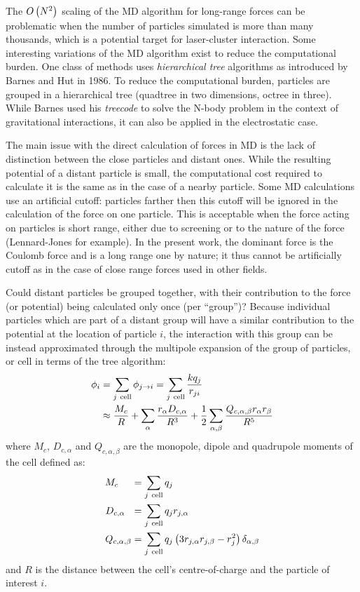 The $O\left( N^2 \right)$ scaling of the MD algorithm
%
for long-range forces
%
can be problematic when the number of
particles simulated is more than many thousands, which is a potential target
for laser-cluster interaction. Some interesting variations of the MD algorithm
exist to reduce the computational burden.
%
One class of methods uses
\textit{hierarchical tree}
algorithms as introduced by Barnes and Hut in 1986\cite{Barnes1986}. To
reduce the computational burden, particles are grouped in a hierarchical tree
(quadtree in two dimensions, octree in three). While Barnes used his
\textit{treecode} to solve the N-body problem in the context of gravitational
interactions, it can also be applied in the electrostatic case.

The main issue with the direct calculation of forces in MD is the lack of
distinction between the close particles and distant ones. While the resulting
potential of a distant particle is small, the computational cost required to
calculate it is the same as in the case of a nearby particle. Some MD
calculations use an artificial cutoff: particles farther then this cutoff will
be ignored in the calculation of the force on one particle. This is acceptable
when the force acting on particles is short range, either due to screening or
to the nature of the force (Lennard-Jones for example).
In the present work, the dominant force is the
Coulomb force and is a long range one by nature; it thus cannot be artificially
cutoff as in the case of close range forces used in other fields.

Could distant particles be grouped together, with their contribution to the
force (or potential) being calculated only once (per ``group'')? Because
individual particles which are part of a distant group will have a similar
contribution to the potential at the location of particle $i$, the interaction
with this group can be instead approximated through the multipole
expansion\cite{Gibbon2002} of the group of particles, or cell in terms of the
tree algorithm:
\begin{align}
\phi_i & = \sum_{j~\textrm{cell}} \phi_{j \rightarrow i} = \sum_{j~{\rm cell}}
\frac{k q_j}{r_{ji}} \\
& \approx \frac{M_{c}}{R}
+ \sum_{\alpha} \frac{r_{\alpha} D_{c,\alpha}}{R^3}
+ \frac{1}{2} \sum_{\alpha,\beta} \frac{
        Q_{c,\alpha,\beta} r_{\alpha} r_{\beta}
    }{R^5}
\end{align}
where $M_{c}$, $D_{c,\alpha}$ and $Q_{c,\alpha,\beta}$ are the monopole, dipole
and quadrupole moments of the cell defined as:
\begin{subequations}
\begin{align}
M_{c}           ~~~~& = \sum_{j~\textrm{cell}} q_{j} \\
D_{c,\alpha}      ~~& = \sum_{j~\textrm{cell}} q_{j} r_{j,\alpha} \\
Q_{c,\alpha,\beta}  & = \sum_{j~\textrm{cell}} q_{j} \left( 3 r_{j,\alpha}
r_{j,\beta} - r_{j}^2 \right) \delta_{\alpha,\beta}
\end{align}
\label{eqn:tree:moments}
\end{subequations}
and $R$ is the distance between the cell's centre-of-charge and the
particle of interest $i$.

